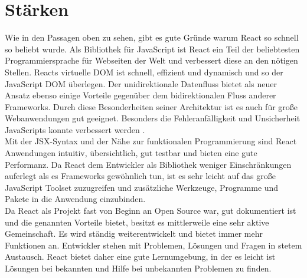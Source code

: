 \section{Stärken}
Wie in den Passagen oben zu sehen, gibt es gute Gründe warum React so schnell so beliebt wurde. Als Bibliothek für JavaScript ist React ein Teil der beliebtesten Programmiersprache für Webseiten der Welt und verbessert diese an den nötigen Stellen. Reacts virtuelle DOM ist schnell, effizient und dynamisch und so der JavaScript DOM überlegen. Der unidirektionale Datenfluss bietet als neuer Ansatz ebenso einige Vorteile gegenüber dem bidirektionalen Fluss anderer Frameworks. Durch diese Besonderheiten seiner Architektur ist es auch für große Webanwendungen gut geeignet. Besonders die Fehleranfälligkeit und Unsicherheit JavaScripts konnte verbessert werden \cite{6}.\\
Mit der JSX-Syntax und der Nähe zur funktionalen Programmierung sind React Anwendungen intuitiv, übersichtlich, gut testbar und bieten eine gute Performanz. Da React dem Entwickler als Bibliothek weniger Einschränkungen auferlegt als es Frameworks gewöhnlich tun, ist es sehr leicht auf das große JavaScript Toolset zuzugreifen und zusätzliche Werkzeuge, Programme und Pakete in die Anwendung einzubinden.\cite{6} \\
Da React als Projekt fast von Beginn an Open Source war, gut dokumentiert ist und die genannten Vorteile bietet, besitzt es mittlerweile eine sehr aktive Gemeinschaft. Es wird ständig weiterentwickelt und bietet immer mehr Funktionen an. Entwickler stehen mit Problemen, Lösungen und Fragen in stetem Austausch. React bietet daher eine gute Lernumgebung, in der es leicht ist Lösungen bei bekannten und Hilfe bei unbekannten Problemen zu finden.\\
